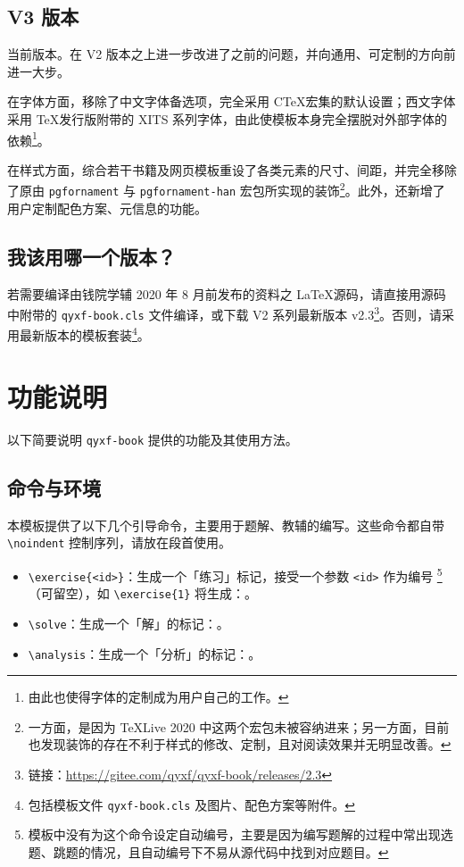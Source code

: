 \documentclass[
    10pt,
    oneside,
    openany,
    b5paper,
    colorscheme = basic  %
]{qyxf-book}
\begin{document}
\subsection{V3 版本}

当前版本。在 V2 版本之上进一步改进了之前的问题，并向通用、可定制的方向前进一大步。

在字体方面，移除了中文字体备选项，完全采用 C\TeX 宏集的默认设置；西文字体采用 \TeX 发行版附带的 XITS 系列字体，由此使模板本身完全摆脱对外部字体的依赖\footnote{由此也使得字体的定制成为用户自己的工作。}。

在样式方面，综合若干书籍及网页模板重设了各类元素的尺寸、间距，并完全移除了原由 \verb|pgfornament| 与 \verb|pgfornament-han| 宏包所实现的装饰\footnote{一方面，是因为 \TeX Live 2020 中这两个宏包未被容纳进来；另一方面，目前也发现装饰的存在不利于样式的修改、定制，且对阅读效果并无明显改善。}。此外，还新增了用户定制配色方案、元信息的功能。

\subsection{我该用哪一个版本？}

若需要编译由钱院学辅 2020 年 8 月前发布的资料之 \LaTeX 源码，请直接用源码中附带的 \verb|qyxf-book.cls| 文件编译，或下载 V2 系列最新版本 v2.3\footnote{链接：\url{https://gitee.com/qyxf/qyxf-book/releases/2.3}}。否则，请采用最新版本的模板套装\footnote{包括模板文件 \texttt{qyxf-book.cls} 及图片、配色方案等附件。}。

\section{功能说明}

以下简要说明 \verb|qyxf-book| 提供的功能及其使用方法。

\subsection{命令与环境}

本模板提供了以下几个引导命令，主要用于题解、教辅的编写。这些命令都自带 \verb|\noindent| 控制序列，请放在段首使用。

\begin{itemize}
  \item \verb|\exercise{<id>}|：生成一个「练习」标记，接受一个参数 \verb|<id>| 作为编号
  \footnote{模板中没有为这个命令设定自动编号，主要是因为编写题解的过程中常出现选题、跳题的情况，且自动编号下不易从源代码中找到对应题目。}
  （可留空），如 \verb|\exercise{1}| 将生成：。
  \item \verb|\solve|：生成一个「解」的标记：\solve。
  \item \verb|\analysis|：生成一个「分析」的标记：\analysis。
\end{itemize}
\end{document}
